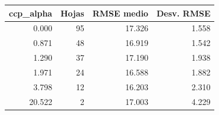 \begin{tabular}{rrrr}
\toprule
ccp\_alpha & Hojas & RMSE medio & Desv. RMSE \\
\midrule
0.000 & 95 & 17.326 & 1.558 \\
0.871 & 48 & 16.919 & 1.542 \\
1.290 & 37 & 17.190 & 1.938 \\
1.971 & 24 & 16.588 & 1.882 \\
3.798 & 12 & 16.203 & 2.310 \\
20.522 & 2 & 17.003 & 4.229 \\
\bottomrule
\end{tabular}
